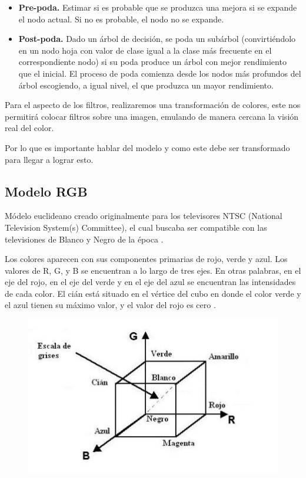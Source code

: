 \documentclass[10pt]{article}
\begin{document}
\begin{itemize}
    \item \textbf{Pre-poda.} Estimar si es probable que se produzca una mejora si se expande el nodo actual. Si no es probable, el nodo no se expande\cite{IEEEreferencias:Ref46}.
   \item \textbf{Post-poda.} Dado un árbol de decisión, se poda un subárbol (convirtiéndolo en un nodo hoja con valor de clase igual a la clase más
    frecuente en el correspondiente nodo) si su poda produce un árbol
con mejor rendimiento que el inicial. El proceso de poda comienza
desde los nodos más profundos del árbol escogiendo, a igual nivel, el
que produzca un mayor rendimiento\cite{IEEEreferencias:Ref46}.

\end{itemize}

Para el aspecto de los filtros, realizaremos una transformación de colores, este nos permitirá colocar filtros sobre una imagen, emulando de manera cercana la visión real del color. 

Por lo que es importante hablar del modelo y como este debe ser transformado para llegar a lograr esto.

\subsection{Modelo RGB}

Módelo euclideano creado originalmente para los televisores NTSC (National Television System(s) Committee), el cual buscaba ser compatible con las televisiones de Blanco y Negro de la época \cite{IEEEreferencias:Ref16}.

Los colores aparecen con sus componentes primarias de rojo, verde y azul. Los valores de R, G, y B se encuentran a lo largo de tres ejes. En otras palabras, en el eje del rojo, en el eje del verde y en el eje del azul se encuentran las intensidades de cada color. El cián está situado en el vértice del cubo en donde el color verde y el azul tienen su máximo valor, y el valor del rojo es cero \cite{IEEEreferencias:Ref16}.
\begin{figure}[H]
	\begin{center}
\includegraphics[scale = 0.85]{Imagenes/cubo.JPG}
	\end{center} 
\end{figure}
\end{document}

